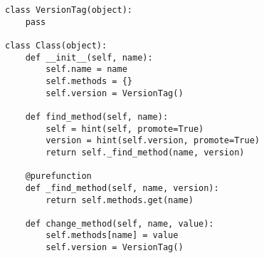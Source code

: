 \begin{lstlisting}[mathescape,basicstyle=\ttfamily]
class VersionTag(object):
    pass

class Class(object):
    def __init__(self, name):
        self.name = name
        self.methods = {}
        self.version = VersionTag()

    def find_method(self, name):
        self = hint(self, promote=True)
        version = hint(self.version, promote=True)
        return self._find_method(name, version)

    @purefunction
    def _find_method(self, name, version):
        return self.methods.get(name)

    def change_method(self, name, value):
        self.methods[name] = value
        self.version = VersionTag()
\end{lstlisting}
